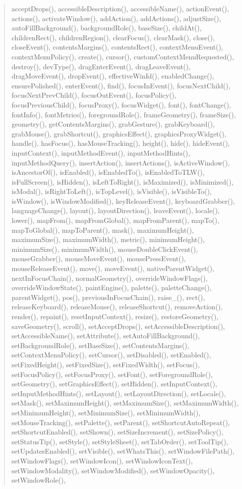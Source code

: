 \begin{quote}
acceptDrops(), accessibleDescription(), accessibleName(), actionEvent(), actions(), activateWindow(), addAction(), addActions(), adjustSize(), autoFillBackground(), backgroundRole(), baseSize(), childAt(), childrenRect(), childrenRegion(), clearFocus(), clearMask(), close(), closeEvent(), contentsMargins(), contentsRect(), contextMenuEvent(), contextMenuPolicy(), create(), cursor(), customContextMenuRequested(), destroy(), devType(), dragEnterEvent(), dragLeaveEvent(), dragMoveEvent(), dropEvent(), effectiveWinId(), enabledChange(), ensurePolished(), enterEvent(), find(), focusInEvent(), focusNextChild(), focusNextPrevChild(), focusOutEvent(), focusPolicy(), focusPreviousChild(), focusProxy(), focusWidget(), font(), fontChange(), fontInfo(), fontMetrics(), foregroundRole(), frameGeometry(), frameSize(), geometry(), getContentsMargins(), grabGesture(), grabKeyboard(), grabMouse(), grabShortcut(), graphicsEffect(), graphicsProxyWidget(), handle(), hasFocus(), hasMouseTracking(), height(), hide(), hideEvent(), inputContext(), inputMethodEvent(), inputMethodHints(), inputMethodQuery(), insertAction(), insertActions(), isActiveWindow(), isAncestorOf(), isEnabled(), isEnabledTo(), isEnabledToTLW(), isFullScreen(), isHidden(), isLeftToRight(), isMaximized(), isMinimized(), isModal(), isRightToLeft(), isTopLevel(), isVisible(), isVisibleTo(), isWindow(), isWindowModified(), keyReleaseEvent(), keyboardGrabber(), languageChange(), layout(), layoutDirection(), leaveEvent(), locale(), lower(), mapFrom(), mapFromGlobal(), mapFromParent(), mapTo(), mapToGlobal(), mapToParent(), mask(), maximumHeight(), maximumSize(), maximumWidth(), metric(), minimumHeight(), minimumSize(), minimumWidth(), mouseDoubleClickEvent(), mouseGrabber(), mouseMoveEvent(), mousePressEvent(), mouseReleaseEvent(), move(), moveEvent(), nativeParentWidget(), nextInFocusChain(), normalGeometry(), overrideWindowFlags(), overrideWindowState(), paintEngine(), palette(), paletteChange(), parentWidget(), pos(), previousInFocusChain(), raise\_(), rect(), releaseKeyboard(), releaseMouse(), releaseShortcut(), removeAction(), render(), repaint(), resetInputContext(), resize(), restoreGeometry(), saveGeometry(), scroll(), setAcceptDrops(), setAccessibleDescription(), setAccessibleName(), setAttribute(), setAutoFillBackground(), setBackgroundRole(), setBaseSize(), setContentsMargins(), setContextMenuPolicy(), setCursor(), setDisabled(), setEnabled(), setFixedHeight(), setFixedSize(), setFixedWidth(), setFocus(), setFocusPolicy(), setFocusProxy(), setFont(), setForegroundRole(), setGeometry(), setGraphicsEffect(), setHidden(), setInputContext(), setInputMethodHints(), setLayout(), setLayoutDirection(), setLocale(), setMask(), setMaximumHeight(), setMaximumSize(), setMaximumWidth(), setMinimumHeight(), setMinimumSize(), setMinimumWidth(), setMouseTracking(), setPalette(), setParent(), setShortcutAutoRepeat(), setShortcutEnabled(), setShown(), setSizeIncrement(), setSizePolicy(), setStatusTip(), setStyle(), setStyleSheet(), setTabOrder(), setToolTip(), setUpdatesEnabled(), setVisible(), setWhatsThis(), setWindowFilePath(), setWindowFlags(), setWindowIcon(), setWindowIconText(), setWindowModality(), setWindowModified(), setWindowOpacity(), setWindowRole(), 
\end{quote}
